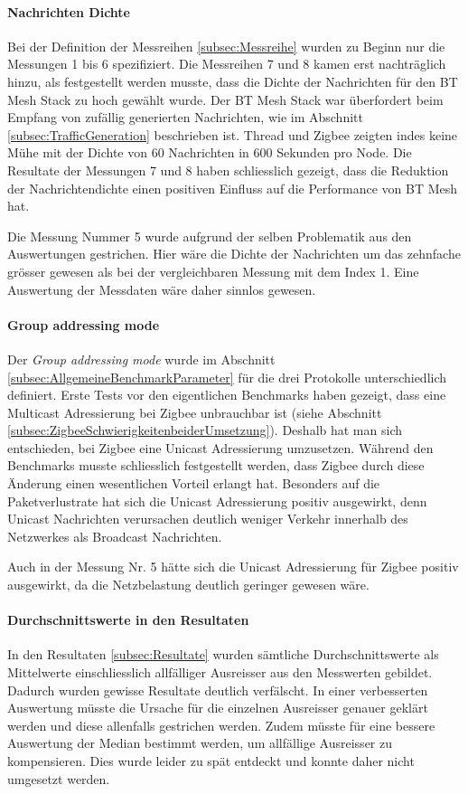 \paragraph{Nachrichten Dichte}
Bei der Definition der Messreihen \ref{subsec:Messreihe} wurden zu Beginn nur die Messungen 1 bis 6 spezifiziert.
Die Messreihen 7 und 8 kamen erst nachträglich hinzu, als festgestellt werden musste, dass die Dichte der Nachrichten für den BT Mesh Stack zu hoch gewählt wurde.
Der BT Mesh Stack war überfordert beim Empfang von zufällig generierten Nachrichten, wie im Abschnitt \ref{subsec:TrafficGeneration} beschrieben ist.
Thread und Zigbee zeigten indes keine Mühe mit der Dichte von 60 Nachrichten in 600 Sekunden pro Node.
Die Resultate der Messungen 7 und 8 haben schliesslich gezeigt, dass die Reduktion der Nachrichtendichte einen positiven Einfluss auf die Performance von BT Mesh hat.

Die Messung Nummer 5 wurde aufgrund der selben Problematik aus den Auswertungen gestrichen. 
Hier wäre die Dichte der Nachrichten um das zehnfache grösser gewesen als bei der vergleichbaren Messung mit dem Index 1.
Eine Auswertung der Messdaten wäre daher sinnlos gewesen.

\paragraph{Group addressing mode}
Der \textit{Group addressing mode} wurde im Abschnitt \ref{subsec:AllgemeineBenchmarkParameter} für die drei Protokolle unterschiedlich definiert.
Erste Tests vor den eigentlichen Benchmarks haben gezeigt, dass eine Multicast Adressierung bei Zigbee unbrauchbar ist (siehe Abschnitt \ref{subsec:ZigbeeSchwierigkeitenbeiderUmsetzung}).
Deshalb hat man sich entschieden, bei Zigbee eine Unicast Adressierung umzusetzen.
Während den Benchmarks musste schliesslich festgestellt werden, dass Zigbee durch diese Änderung einen wesentlichen Vorteil erlangt hat.
Besonders auf die Paketverlustrate hat sich die Unicast Adressierung positiv ausgewirkt, denn Unicast Nachrichten verursachen deutlich weniger Verkehr innerhalb des Netzwerkes als Broadcast Nachrichten.

Auch in der Messung Nr. 5 hätte sich die Unicast Adressierung für Zigbee positiv ausgewirkt, da die Netzbelastung deutlich geringer gewesen wäre.
 
\paragraph{Durchschnittswerte in den Resultaten}
In den Resultaten \ref{subsec:Resultate} wurden sämtliche Durchschnittswerte als Mittelwerte einschliesslich allfälliger Ausreisser aus den Messwerten gebildet.
Dadurch wurden gewisse Resultate deutlich verfälscht.
In einer verbesserten Auswertung müsste die Ursache für die einzelnen Ausreisser genauer geklärt werden und diese allenfalls gestrichen werden. Zudem müsste für eine bessere Auswertung der Median bestimmt werden, um allfällige Ausreisser zu kompensieren.
Dies wurde leider zu spät entdeckt und konnte daher nicht umgesetzt werden.


